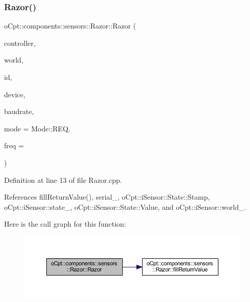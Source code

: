 \subsubsection{\texorpdfstring{Razor()}{Razor()}}
{\footnotesize\ttfamily o\+Cpt\+::components\+::sensors\+::\+Razor\+::\+Razor (\begin{DoxyParamCaption}\item[{\hyperlink{classo_cpt_1_1i_controller_a6d89a95cd6ad68bb74adfaca2f36370f}{i\+Controller\+::ptr}}]{controller,  }\item[{\hyperlink{classo_cpt_1_1_world_aa6e591e3096d5de71e0cec9039663d67}{World\+::ptr}}]{world,  }\item[{std\+::string}]{id,  }\item[{std\+::string}]{device,  }\item[{unsigned int}]{baudrate,  }\item[{\hyperlink{classo_cpt_1_1components_1_1sensors_1_1_razor_afed258e485aaaf9193a57d649ccb159b}{Mode}}]{mode = {\ttfamily Mode\+:\+:REQ},  }\item[{uint8\+\_\+t}]{freq = {} }\end{DoxyParamCaption})}



Definition at line 13 of file Razor.\+cpp.



References fill\+Return\+Value(), serial\+\_\+, o\+Cpt\+::i\+Sensor\+::\+State\+::\+Stamp, o\+Cpt\+::i\+Sensor\+::state\+\_\+, o\+Cpt\+::i\+Sensor\+::\+State\+::\+Value, and o\+Cpt\+::i\+Sensor\+::world\+\_\+.

Here is the call graph for this function\+:\nopagebreak
\begin{figure}[H]
\begin{center}
\leavevmode
\includegraphics[width=350pt]{classo_cpt_1_1components_1_1sensors_1_1_razor_aad2e22f7bc7227be565cab124d471a40_cgraph}
\end{center}
\end{figure}
\hypertarget{classo_cpt_1_1components_1_1sensors_1_1_razor_ae77b23479f6e7b52ed25c9989a0f1903}{}\label{classo_cpt_1_1components_1_1sensors_1_1_razor_ae77b23479f6e7b52ed25c9989a0f1903} 
